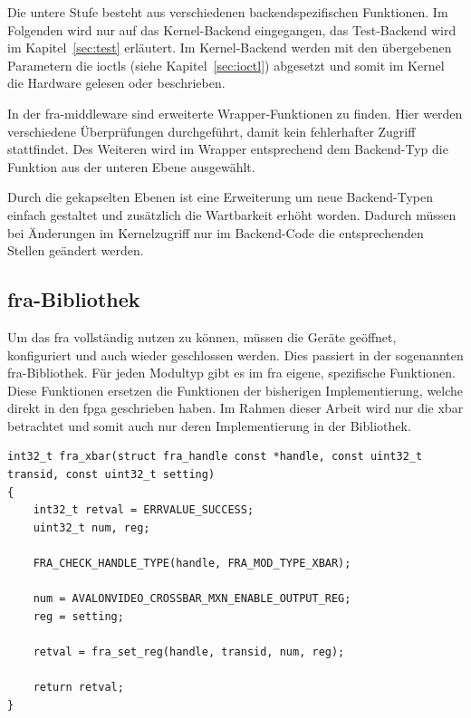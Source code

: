 Die untere Stufe besteht aus verschiedenen backendspezifischen Funktionen. Im Folgenden wird nur auf das Kernel-Backend eingegangen, das Test-Backend wird im Kapitel~\ref{sec:test} erläutert. Im Kernel-Backend werden mit den übergebenen Parametern die \ac{ioctl}s (siehe Kapitel~\ref{sec:ioctl}) abgesetzt und somit im Kernel die Hardware gelesen oder beschrieben.

In der \ac{fra}-\gls{middleware} sind erweiterte Wrapper-Funktionen zu finden. Hier werden verschiedene Überprüfungen durchgeführt, damit kein fehlerhafter Zugriff stattfindet. Des Weiteren wird im Wrapper entsprechend dem Backend-Typ die Funktion aus der unteren Ebene ausgewählt. 


Durch die gekapselten Ebenen ist eine Erweiterung um neue Backend-Typen einfach gestaltet und zusätzlich die Wartbarkeit erhöht worden. 
Dadurch müssen bei Änderungen im Kernelzugriff nur im Backend-Code die entsprechenden Stellen geändert werden.\\

\subsection{\acs{fra}-Bibliothek}
Um das \ac{fra} vollständig nutzen zu können, müssen die Geräte geöffnet, konfiguriert und auch wieder geschlossen werden. Dies passiert in der sogenannten \ac{fra}-Bibliothek. 
Für jeden Modultyp gibt es im \ac{fra} eigene, spezifische Funktionen. Diese Funktionen ersetzen die Funktionen der bisherigen Implementierung, welche direkt in den \ac{fpga} geschrieben haben. Im Rahmen dieser Arbeit wird nur die \ac{xbar} betrachtet und somit auch nur deren Implementierung in der Bibliothek.

\begin{lstfloat}
\begin{lstlisting}
int32_t fra_xbar(struct fra_handle const *handle, const uint32_t transid, const uint32_t setting)
{
	int32_t retval = ERRVALUE_SUCCESS;
	uint32_t num, reg;
	
	FRA_CHECK_HANDLE_TYPE(handle, FRA_MOD_TYPE_XBAR);
	
	num = AVALONVIDEO_CROSSBAR_MXN_ENABLE_OUTPUT_REG;
	reg = setting;
	
	retval = fra_set_reg(handle, transid, num, reg);  
	
	return retval;
}
\end{lstlisting}
\end{lstfloat}

